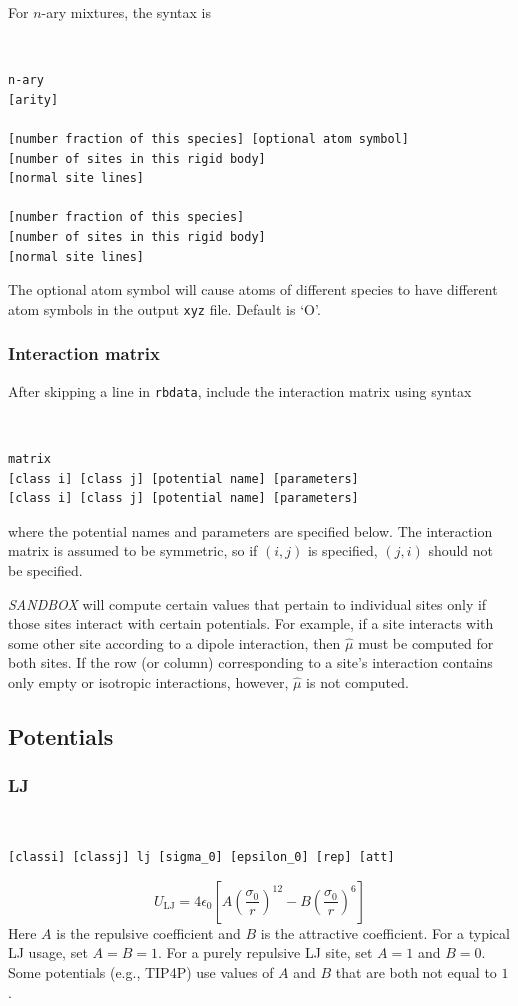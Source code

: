 \documentclass[12pt,a4paper,dvips]{article}
\begin{document}
For $n$-ary mixtures, the syntax is
{\tt
\begin{verbatim}
n-ary
[arity]

[number fraction of this species] [optional atom symbol]
[number of sites in this rigid body]
[normal site lines]

[number fraction of this species]
[number of sites in this rigid body]
[normal site lines]

\end{verbatim}
}
The optional atom symbol will cause atoms of different species to have different atom symbols in the output {\tt xyz} file. Default is `O'.

\subsubsection{Interaction matrix}
After skipping a line in {\tt rbdata}, include the interaction matrix using syntax

{\tt
\begin{verbatim}
matrix
[class i] [class j] [potential name] [parameters]
[class i] [class j] [potential name] [parameters]
\end{verbatim}
}
where the potential names and parameters are specified below. The interaction matrix is assumed to be symmetric, so if $(i,j)$ is specified, $(j,i)$ should not be specified.

{\it SANDBOX} will compute certain values that pertain to individual sites only if those sites interact with certain potentials. For example, if a site interacts with some other site according to a dipole interaction, then $\hat{\mu}$ must be computed for both sites. If the row (or column) corresponding to a site's interaction contains only empty or isotropic interactions, however, $\hat{\mu}$ is not computed.

\subsection{Potentials}
\subsubsection{LJ}
{\tt
\begin{verbatim}
[classi] [classj] lj [sigma_0] [epsilon_0] [rep] [att]
\end{verbatim}
}
\begin{equation}
    U_{\mathrm{LJ}} = 4 \epsilon_0 \left[ A \left(\frac{\sigma_0}{r}\right)^{12} - B \left(\frac{\sigma_0}{r}\right)^6\right]
\end{equation}
Here $A$ is the repulsive coefficient and $B$ is the attractive coefficient. For a typical LJ usage, set $A = B = 1$. For a purely repulsive LJ site, set $A = 1$ and $B = 0$. Some potentials (e.g., TIP4P) use values of $A$ and $B$ that are both not equal to $1$.
\end{document}
